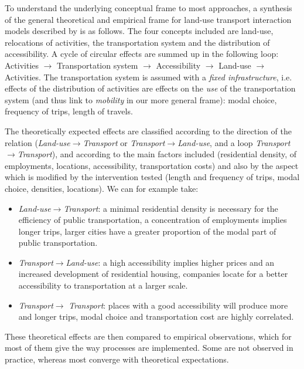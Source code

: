 \documentclass[10pt]{article}
\begin{document}
To understand the underlying conceptual frame to most approaches, a synthesis of the general theoretical and empirical frame for land-use transport interaction models described by \cite{wegener2004land} is as follows. The four concepts included are land-use, relocations of activities, the transportation system and the distribution of accessibility. A cycle of circular effects are summed up in the following loop: Activities $\longrightarrow$ Transportation system $\longrightarrow$ Accessibility $\longrightarrow$ Land-use $\longrightarrow$ Activities. %
The transportation system is assumed with a \emph{fixed infrastructure}, i.e. effects of the distribution of activities are effects on the \emph{use} of the transportation system (and thus link to \emph{mobility} in our more general frame): modal choice, frequency of trips, length of travels.

The theoretically expected effects are classified according to the direction of the relation (\textit{Land-use}$\rightarrow$\textit{Transport} or \textit{Transport}$\rightarrow$\textit{Land-use}, and a loop \textit{Transport}$\rightarrow$\textit{Transport}), and according to the main factors included (residential density, of employments, locations, accessibility, transportation costs) and also by the aspect which is modified by the intervention tested (length and frequency of trips, modal choice, densities, locations). We can for example take:
		\begin{itemize}
		\item \textit{Land-use}$\rightarrow$\textit{Transport}: a minimal residential density is necessary for the efficiency of public transportation, a concentration of employments implies longer trips, larger cities have a greater proportion of the modal part of public transportation.
		\item \textit{Transport}$\rightarrow$\textit{Land-use}: a high accessibility implies higher prices and an increased development of residential housing, companies locate for a better accessibility to transportation at a larger scale.
		\item \textit{Transport}$\rightarrow$ \textit{Transport}: places with a good accessibility will produce more and longer trips, modal choice and transportation cost are highly correlated. 
		\end{itemize}
				
These theoretical effects are then compared to empirical observations, which for most of them give the way processes are implemented. Some are not observed in practice, whereas most converge with theoretical expectations.
\end{document}
